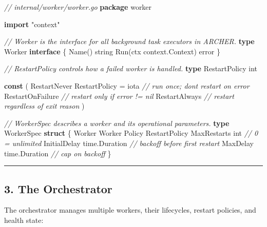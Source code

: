 \documentclass[
]{article}
\newenvironment{Shaded}{}{}
\newcommand{\CommentTok}[1]{\textcolor[rgb]{0.38,0.63,0.69}{\textit{#1}}}
\newcommand{\DataTypeTok}[1]{\textcolor[rgb]{0.56,0.13,0.00}{#1}}
\newcommand{\KeywordTok}[1]{\textcolor[rgb]{0.00,0.44,0.13}{\textbf{#1}}}
\newcommand{\NormalTok}[1]{#1}
\newcommand{\OperatorTok}[1]{\textcolor[rgb]{0.40,0.40,0.40}{#1}}
\newcommand{\OtherTok}[1]{\textcolor[rgb]{0.00,0.44,0.13}{#1}}
\newcommand{\StringTok}[1]{\textcolor[rgb]{0.25,0.44,0.63}{#1}}
\begin{document}
\begin{Shaded}
\begin{Highlighting}[]
\CommentTok{// internal/worker/worker.go}
\KeywordTok{package}\NormalTok{ worker}

\KeywordTok{import} \StringTok{"context"}

\CommentTok{// Worker is the interface for all background task executors in ARCHER.}
\KeywordTok{type}\NormalTok{ Worker }\KeywordTok{interface} \OperatorTok{\{}
\NormalTok{    Name}\OperatorTok{()} \DataTypeTok{string}
\NormalTok{    Run}\OperatorTok{(}\NormalTok{ctx context}\OperatorTok{.}\NormalTok{Context}\OperatorTok{)} \DataTypeTok{error}
\OperatorTok{\}}

\CommentTok{// RestartPolicy controls how a failed worker is handled.}
\KeywordTok{type}\NormalTok{ RestartPolicy }\DataTypeTok{int}

\KeywordTok{const} \OperatorTok{(}
\NormalTok{    RestartNever      RestartPolicy }\OperatorTok{=} \OtherTok{iota} \CommentTok{// run once; don\textquotesingle{}t restart on error}
\NormalTok{    RestartOnFailure                       }\CommentTok{// restart only if error != nil}
\NormalTok{    RestartAlways                          }\CommentTok{// restart regardless of exit reason}
\OperatorTok{)}

\CommentTok{// WorkerSpec describes a worker and its operational parameters.}
\KeywordTok{type}\NormalTok{ WorkerSpec }\KeywordTok{struct} \OperatorTok{\{}
\NormalTok{    Worker        Worker}
\NormalTok{    Policy        RestartPolicy}
\NormalTok{    MaxRestarts   }\DataTypeTok{int}           \CommentTok{// 0 = unlimited}
\NormalTok{    InitialDelay  time}\OperatorTok{.}\NormalTok{Duration }\CommentTok{// backoff before first restart}
\NormalTok{    MaxDelay      time}\OperatorTok{.}\NormalTok{Duration }\CommentTok{// cap on backoff}
\OperatorTok{\}}
\end{Highlighting}
\end{Shaded}

\begin{center}\rule{0.5\linewidth}{0.5pt}\end{center}

\hypertarget{the-orchestrator}{%
\subsection{3. The Orchestrator}\label{the-orchestrator}}

The orchestrator manages multiple workers, their lifecycles, restart
policies, and health state:
\end{document}
